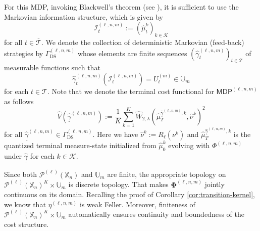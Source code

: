 \documentclass[11pt]{article}
\newcommand{\XX}{\mathbb{X}}
\newcommand{\UU}{\mathbb{U}}
\newcommand{\cI}{\mathcal{I}}
\newcommand{\cK}{\mathcal{K}}
\newcommand{\cP}{\mathcal{P}}
\newcommand{\cT}{\mathcal{T}}
\begin{document}
For this MDP, invoking Blackwell's theorem (see \citep{blackwell1964memoryless}), it is sufficient to use the Markovian information structure, which is given by
\begin{equation*}
    \cI_{t}^{(\ell,n,m)} := (\hat{\mu}_{t}^{k})_{k\in\cK}
\end{equation*}
for all $t\in\overline{\cT}$. We denote the collection of deterministic Markovian (feed-back) strategies by $\Gamma_{\mathrm{DS}}^{(\ell,n,m)}$ whose elements are finite sequences $(\hat{\gamma}_{t}^{(\ell,n,m)})_{t\in\cT}$ of measurable functions such that
\begin{equation*}
    \hat{\gamma}_{t}^{(\ell,n,m)}(\cI_{t}^{(\ell,n,m)}) = U_t^{(m)}\in\UU_m
\end{equation*}
for each $t\in\cT$. Note that we denote the terminal cost functional for $\mathsf{MDP}^{(\ell,n,m)}$ as follows
\begin{equation}
    \hat{V}(\underline{\hat{\gamma}}^{(\ell,n,m)}) := \frac{1}{K}\sum_{k=1}^K \hat{W}_{2,\lambda}(\hat{\mu}_T^{\underline{\hat{\gamma}}^{(\ell,n,m)},k}, \hat{\nu}^k)^2
\end{equation}
for all $\underline{\hat{\gamma}}^{(\ell,n,m)}\in\Gamma_{\mathrm{DS}}^{(\ell,n,m)}$. Here we have $\hat{\nu}^k := R_\ell(\nu^k)$ and $\hat{\mu}_T^{\underline{\hat{\gamma}}^{(\ell,n,m)},k}$ is the quantized terminal measure-state initialized from $\hat{\mu}_0^k$ evolving with $\Phi^{(\ell,n,m)}$ under $\underline{\hat{\gamma}}$ for each $k\in\cK$.
\begin{remark}\label{remark:mdp_ell_n_m}
    Since both $\cP^{(\ell)}(\XX_n)$ and $\UU_m$ are finite, the appropriate topology on $\cP^{(\ell)}(\XX_n)^K\times\UU_m$ is discrete topology. That makes $\bm{\Phi}^{(\ell,n,m)}$ jointly continuous on its domain. Recalling the proof of Corollary \ref{cor:transition-kernel}, we know that $\eta^{(\ell,n,m)}$ is weak Feller. Moreover, finiteness of $\cP^{(\ell)}(\XX_n)^K\times\UU_m$ automatically ensures continuity and boundedness of the cost structure.
\end{remark}
\end{document}
